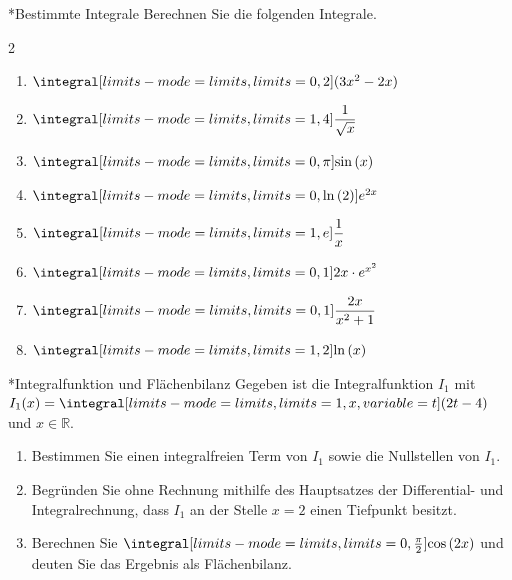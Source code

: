 
\begin{uebung}*{Bestimmte Integrale}
Berechnen Sie die folgenden Integrale.
\begin{multicols}{2}
\begin{enumerate}[label=\alph*)]
  \item $\integral[limits-mode=limits,limits={0, 2}]{(3x^2-2x)}$
  \item $\integral[limits-mode=limits,limits={1, 4}]{\dfrac{1}{\sqrt{x}}}$
  \item $\integral[limits-mode=limits,limits={0, \pi}]{\sin{(x)}}$
  \item $\integral[limits-mode=limits,limits={0, \ln{(2)}}]{e^{2x}}$
  \item $\integral[limits-mode=limits,limits={1, e}]{\dfrac{1}{x}}$
  \item $\integral[limits-mode=limits,limits={0, 1}]{2x\cdot e^{x^2}}$
  \item $\integral[limits-mode=limits,limits={0, 1}]{\dfrac{2x}{x^2+1}}$
  \item $\integral[limits-mode=limits,limits={1, 2}]{\ln{(x)}}$
\end{enumerate}
\end{multicols}
\end{uebung}

\begin{uebung}*{Integralfunktion und Flächenbilanz}
Gegeben ist die Integralfunktion $I_1$ mit $I_1(x) = \integral[limits-mode=limits,limits={1, x}, variable={t}]{(2t-4)}$ und $x\in\mathds{R}$.
\begin{enumerate}[label=\alph*)]
  \item Bestimmen Sie einen integralfreien Term von $I_1$ sowie die Nullstellen von $I_1$.
  \item Begründen Sie ohne Rechnung mithilfe des Hauptsatzes der Differential- und Integralrechnung, dass $I_1$ an der Stelle $x=2$ einen Tiefpunkt besitzt.
  \item Berechnen Sie $\integral[limits-mode=limits,limits={0, \frac{\pi}{2}}]{\cos{(2x)}}$ und deuten Sie das Ergebnis als Flächenbilanz.
\end{enumerate}
\end{uebung}


